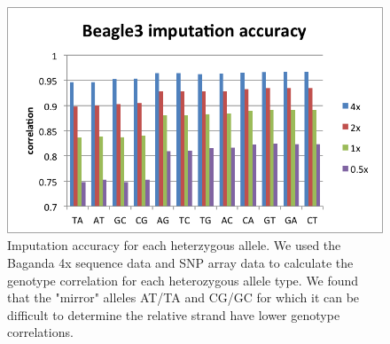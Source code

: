 \begin{figure}[htp]
\centering
\includegraphics{Chapter3/fig/imp_accu_allele}
\caption{Imputation accuracy for each heterzygous allele. We used the Baganda 4x sequence data and SNP array data to calculate the genotype correlation for each heterozygous allele type. We found that the "mirror" alleles AT/TA and CG/GC for which it can be difficult to determine the relative strand have lower genotype correlations. }
\label{fig:imp_accu_allele}
\end{figure}